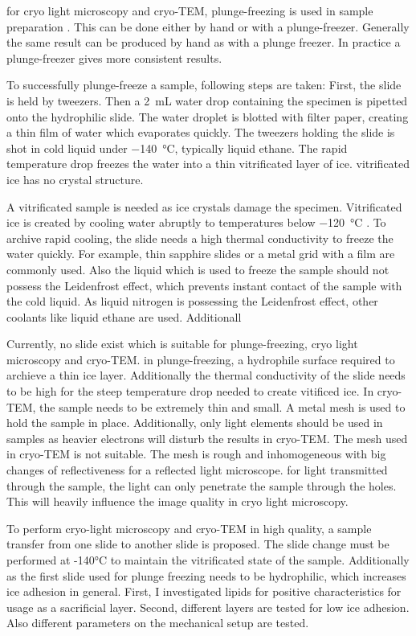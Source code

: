 for cryo light microscopy and cryo-TEM, plunge-freezing is used in sample preparation \cite{Danino.2012} \cite{Faoro.2018}. This can be done either by hand or with a plunge-freezer. Generally the same result can be produced by hand as with a plunge freezer. In practice a plunge-freezer gives more consistent results.

To successfully plunge-freeze a sample, following steps are taken: First, the slide is held by tweezers. Then a \SI{2}{\milli\liter} water drop containing the specimen is pipetted onto the hydrophilic slide. The water droplet is blotted with filter paper, creating a thin film of water which evaporates quickly. The tweezers holding the slide is shot in cold liquid under \SI{-140}{\degreeCelsius}, typically liquid ethane. The rapid temperature drop freezes the water into a thin vitrificated layer of ice. vitrificated ice has no crystal structure.

A vitrificated sample is needed as ice crystals damage the specimen. Vitrificated ice is created by cooling water abruptly to temperatures below \SI{-120}{\degreeCelsius} \cite{Wowk.2010}. To archive rapid cooling, the slide needs a high thermal conductivity to freeze the water quickly. For example, thin sapphire slides or a metal grid with a film are commonly used. Also the liquid which is used to freeze the sample should not possess the Leidenfrost effect, which prevents instant contact of the sample with the cold liquid. As liquid nitrogen is possessing the Leidenfrost effect, other coolants like liquid ethane are used. Additionall

Currently, no slide exist which is suitable for plunge-freezing, cryo light microscopy and cryo-TEM. in plunge-freezing, a hydrophile surface required to archieve a thin ice layer. Additionally the thermal conductivity of the slide needs to be high for the steep temperature drop needed to create vitificed ice. In cryo-TEM, the sample needs to be extremely thin and small. A metal mesh is used to hold the sample in place. Additionally, only light elements should be used in samples as heavier electrons will disturb the results in cryo-TEM. The mesh used in cryo-TEM is not suitable. The mesh is rough and inhomogeneous with big changes of reflectiveness for a reflected light microscope. for light transmitted through the sample, the light can only penetrate the sample through the holes. This will heavily influence the image quality in cryo light microscopy.
 
To perform cryo-light microscopy and cryo-TEM in high quality, a sample transfer from one slide to another slide is proposed. The slide change must be performed at -140°C to maintain the vitrificated state of the sample. Additionally as the first slide used for plunge freezing needs to be hydrophilic, which increases ice adhesion in general. First, I investigated lipids for positive characteristics for usage as a sacrificial layer. Second, different layers are tested for low ice adhesion. Also different parameters on the mechanical setup are tested.

